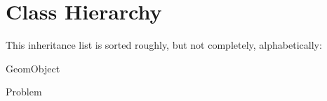\section{Class Hierarchy}
This inheritance list is sorted roughly, but not completely, alphabetically\+:\begin{DoxyCompactList}
\item Geom\+Object\begin{DoxyCompactList}
\item {}
\end{DoxyCompactList}
\item Problem\begin{DoxyCompactList}
\item {}
\end{DoxyCompactList}
\end{DoxyCompactList}
